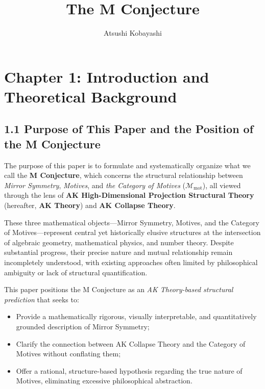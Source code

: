 \documentclass[11pt]{article}
\title{The M Conjecture}
\author{Atsushi Kobayashi}
\date{}
\begin{document}
\maketitle


\section{Chapter 1: Introduction and Theoretical Background}

\subsection{1.1 Purpose of This Paper and the Position of the M Conjecture}

The purpose of this paper is to formulate and systematically organize what we call the \textbf{M Conjecture}, which concerns the structural relationship between \textit{Mirror Symmetry}, \textit{Motives}, and \textit{the Category of Motives} ($\mathcal{M}_{\mathrm{mot}}$), all viewed through the lens of \textbf{AK High-Dimensional Projection Structural Theory} (hereafter, \textbf{AK Theory}) and \textbf{AK Collapse Theory}.

These three mathematical objects—Mirror Symmetry, Motives, and the Category of Motives—represent central yet historically elusive structures at the intersection of algebraic geometry, mathematical physics, and number theory. Despite substantial progress, their precise nature and mutual relationship remain incompletely understood, with existing approaches often limited by philosophical ambiguity or lack of structural quantification.

This paper positions the M Conjecture as an \emph{AK Theory-based structural prediction} that seeks to:

\begin{itemize}
    \item Provide a mathematically rigorous, visually interpretable, and quantitatively grounded description of Mirror Symmetry;
    \item Clarify the connection between AK Collapse Theory and the Category of Motives without conflating them;
    \item Offer a rational, structure-based hypothesis regarding the true nature of Motives, eliminating excessive philosophical abstraction.
\end{itemize}
\end{document}
